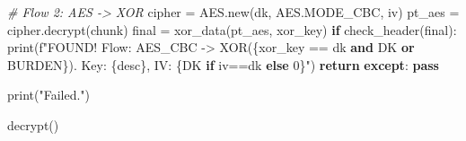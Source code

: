 \documentclass[
]{article}
\newenvironment{Shaded}{}{}
\newcommand{\BuiltInTok}[1]{\textcolor[rgb]{0.00,0.50,0.00}{#1}}
\newcommand{\CommentTok}[1]{\textcolor[rgb]{0.38,0.63,0.69}{\textit{#1}}}
\newcommand{\ControlFlowTok}[1]{\textcolor[rgb]{0.00,0.44,0.13}{\textbf{#1}}}
\newcommand{\KeywordTok}[1]{\textcolor[rgb]{0.00,0.44,0.13}{\textbf{#1}}}
\newcommand{\NormalTok}[1]{#1}
\newcommand{\OperatorTok}[1]{\textcolor[rgb]{0.40,0.40,0.40}{#1}}
\newcommand{\SpecialCharTok}[1]{\textcolor[rgb]{0.25,0.44,0.63}{#1}}
\newcommand{\SpecialStringTok}[1]{\textcolor[rgb]{0.73,0.40,0.53}{#1}}
\newcommand{\StringTok}[1]{\textcolor[rgb]{0.25,0.44,0.63}{#1}}
\begin{document}
\begin{Shaded}
\begin{Highlighting}[]
                    \CommentTok{\# Flow 2: AES {-}\textgreater{} XOR}
\NormalTok{                    cipher }\OperatorTok{=}\NormalTok{ AES.new(dk, AES.MODE\_CBC, iv)}
\NormalTok{                    pt\_aes }\OperatorTok{=}\NormalTok{ cipher.decrypt(chunk)}
\NormalTok{                    final }\OperatorTok{=}\NormalTok{ xor\_data(pt\_aes, xor\_key)}
                    \ControlFlowTok{if}\NormalTok{ check\_header(final):}
                        \BuiltInTok{print}\NormalTok{(}\SpecialStringTok{f"FOUND! Flow: AES\_CBC {-}\textgreater{} XOR(}\SpecialCharTok{\{}\NormalTok{xor\_key }\OperatorTok{==}\NormalTok{ dk }\KeywordTok{and} \StringTok{\textquotesingle{}DK\textquotesingle{}} \KeywordTok{or} \StringTok{\textquotesingle{}BURDEN\textquotesingle{}}\SpecialCharTok{\}}\SpecialStringTok{). Key: }\SpecialCharTok{\{}\NormalTok{desc}\SpecialCharTok{\}}\SpecialStringTok{, IV: }\SpecialCharTok{\{}\StringTok{\textquotesingle{}DK\textquotesingle{}} \ControlFlowTok{if}\NormalTok{ iv}\OperatorTok{==}\NormalTok{dk }\ControlFlowTok{else} \StringTok{\textquotesingle{}0\textquotesingle{}}\SpecialCharTok{\}}\SpecialStringTok{"}\NormalTok{)}
                        \ControlFlowTok{return}
                \ControlFlowTok{except}\NormalTok{:}
                    \ControlFlowTok{pass}
                    
    \BuiltInTok{print}\NormalTok{(}\StringTok{"Failed."}\NormalTok{)}

\NormalTok{decrypt()}
\end{Highlighting}
\end{Shaded}
\end{document}

